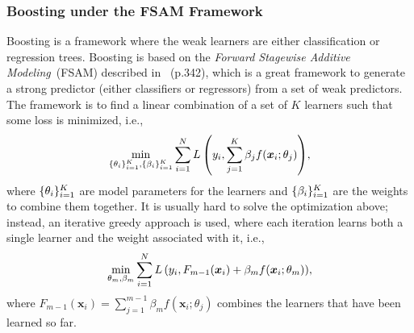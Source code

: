     \subsubsection{Boosting under the FSAM Framework}\label{sec:boosting-trees}
        Boosting is a framework where the weak learners are either classification or regression trees.
        Boosting is based on the \emph{Forward Stagewise Additive Modeling}~(FSAM) described in~\cite{hastie2009elements} (p.342), which is a great framework to generate a strong predictor (either classifiers or regressors) from a set of weak predictors.
        The framework is to find a linear combination of a set of $K$ learners such that some loss is minimized, i.e., 
            \begin{equation}
                \min_{\{ \theta_i \}_{i=1}^{K}, \{ \beta_i \}_{i=1}^{K} } \sum_{i=1}^{N}{L\left( y_i, \sum_{j=1}^{K}{\beta_j f(\bm{x}_i; \theta_j)} \right)},
            \end{equation}
        where $\{ \theta_i \}_{i=1}^{K}$ are model parameters for the learners and $\{ \beta_i \}_{i=1}^{K}$ are the weights to combine them together.
        It is usually hard to solve the optimization above; instead, an iterative greedy approach is used, where each iteration learns both a single learner and the weight associated with it, i.e., 
            \begin{equation}\label{eq:forward-stagewise-add-model}
                \min_{\theta_m, \beta_m} \sum_{i=1}^{N}{
                    L\left( y_i, F_{m-1}(\bm{x}_i) + \beta_m f(\bm{x}_i; \theta_m) \right)
                },
            \end{equation}
        where $F_{m-1}(\bm{x}_i) = \sum_{j=1}^{m-1}{\beta_m f(\bm{x}_i; \theta_j)}$ combines the learners that have been learned so far. 
        
